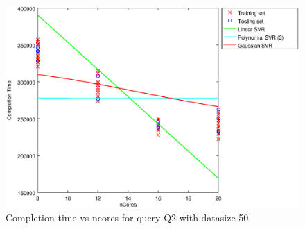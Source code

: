 
\begin {figure}[hbtp]
\centering
\includegraphics[width=\textwidth]{output/Q2_50_ALL_FEATURES/plot_Q2_50_bestmodels.eps}
\caption{Completion time vs ncores for query Q2 with datasize 50}
\label{fig:all_linear_Q2_50}
\end {figure}
